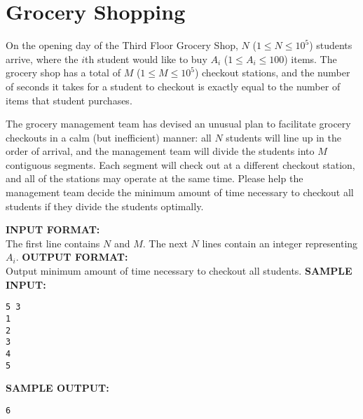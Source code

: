 \documentclass{article}
\begin{document}
\newcommand{\blank}{\vskip 3mm}
\setlength\parindent{0pt}
\renewcommand\thesection{\Alph{section}}

\setcounter{section}{9}
\section{Grocery Shopping}

On the opening day of the Third Floor Grocery Shop, $N$ ($1 \leq N \leq 10^5$) students arrive, where the $i$th student would like to buy $A_i$ ($1 \leq A_i \leq 100$) items. The grocery shop has a total of $M$ ($1 \leq M \leq 10^5$) checkout stations, and the number of seconds it takes for a student to checkout is exactly equal to the number of items that student purchases.

The grocery management team has devised an unusual plan to facilitate grocery checkouts in a calm (but inefficient) manner: all $N$ students will line up in the order of arrival, and the management team will divide the students into $M$ contiguous segments. Each segment will check out at a different checkout station, and all of the stations may operate at the same time. Please help the management team decide the minimum amount of time necessary to checkout all students if they divide the students optimally.

\blank
\textbf{INPUT FORMAT:}\\
The first line contains $N$ and $M$.
The next $N$ lines contain an integer representing $A_i$.
\blank
\textbf{OUTPUT FORMAT:}\\
Output minimum amount of time necessary to checkout all students.
\blank
\textbf{SAMPLE INPUT:}
\begin{verbatim}
5 3
1
2
3
4
5
\end{verbatim}
\textbf{SAMPLE OUTPUT:}
\begin{verbatim}
6
\end{verbatim}
\end{document}
